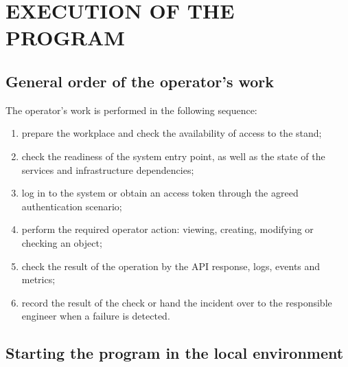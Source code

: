 \documentclass[12pt,a4paper]{extarticle}
\begin{document}
\clearpage

\section{EXECUTION OF THE PROGRAM}

\subsection{General order of the operator's work}

\begin{hseExample}
The operator's work is performed in the following sequence:

\begin{enumerate}[label=\arabic*), leftmargin=1.25cm]
    \item prepare the workplace and check the availability of access to the stand;
    \item check the readiness of the system entry point, as well as the state of the services and infrastructure dependencies;
    \item log in to the system or obtain an access token through the agreed authentication scenario;
    \item perform the required operator action: viewing, creating, modifying or checking an object;
    \item check the result of the operation by the API response, logs, events and metrics;
    \item record the result of the check or hand the incident over to the responsible engineer when a failure is detected.
\end{enumerate}
\end{hseExample}

\subsection{Starting the program in the local environment}
\end{document}
